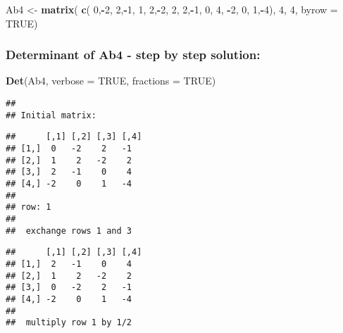 \documentclass[
  10pt,
  a4paper,
]{article}
\newenvironment{Shaded}{\begin{snugshade}}{\end{snugshade}}
\newcommand{\AttributeTok}[1]{\textcolor[rgb]{0.13,0.29,0.53}{#1}}
\newcommand{\ConstantTok}[1]{\textcolor[rgb]{0.56,0.35,0.01}{#1}}
\newcommand{\DecValTok}[1]{\textcolor[rgb]{0.00,0.00,0.81}{#1}}
\newcommand{\FunctionTok}[1]{\textcolor[rgb]{0.13,0.29,0.53}{\textbf{#1}}}
\newcommand{\NormalTok}[1]{#1}
\newcommand{\OtherTok}[1]{\textcolor[rgb]{0.56,0.35,0.01}{#1}}
\newcommand{\SpecialCharTok}[1]{\textcolor[rgb]{0.81,0.36,0.00}{\textbf{#1}}}
\begin{document}
\begin{Shaded}
\begin{Highlighting}[]
\NormalTok{Ab4 }\OtherTok{\textless{}{-}} \FunctionTok{matrix}\NormalTok{(}
        \FunctionTok{c}\NormalTok{( }\DecValTok{0}\NormalTok{,}\SpecialCharTok{{-}}\DecValTok{2}\NormalTok{, }\DecValTok{2}\NormalTok{,}\SpecialCharTok{{-}}\DecValTok{1}\NormalTok{,}
           \DecValTok{1}\NormalTok{, }\DecValTok{2}\NormalTok{,}\SpecialCharTok{{-}}\DecValTok{2}\NormalTok{, }\DecValTok{2}\NormalTok{,}
           \DecValTok{2}\NormalTok{,}\SpecialCharTok{{-}}\DecValTok{1}\NormalTok{, }\DecValTok{0}\NormalTok{, }\DecValTok{4}\NormalTok{,}
          \SpecialCharTok{{-}}\DecValTok{2}\NormalTok{, }\DecValTok{0}\NormalTok{, }\DecValTok{1}\NormalTok{,}\SpecialCharTok{{-}}\DecValTok{4}\NormalTok{), }\DecValTok{4}\NormalTok{, }\DecValTok{4}\NormalTok{, }\AttributeTok{byrow =} \ConstantTok{TRUE}\NormalTok{)}
\end{Highlighting}
\end{Shaded}

\hypertarget{determinant-of-ab4---step-by-step-solution}{%
\subsubsection{Determinant of Ab4 - step by step
solution:}\label{determinant-of-ab4---step-by-step-solution}}

\begin{Shaded}
\begin{Highlighting}[]
\FunctionTok{Det}\NormalTok{(Ab4, }\AttributeTok{verbose =} \ConstantTok{TRUE}\NormalTok{, }\AttributeTok{fractions =} \ConstantTok{TRUE}\NormalTok{)}
\end{Highlighting}
\end{Shaded}

\begin{verbatim}
## 
## Initial matrix:
\end{verbatim}

\begin{verbatim}
##      [,1] [,2] [,3] [,4]
## [1,]  0   -2    2   -1  
## [2,]  1    2   -2    2  
## [3,]  2   -1    0    4  
## [4,] -2    0    1   -4  
## 
## row: 1 
## 
##  exchange rows 1 and 3
\end{verbatim}

\begin{verbatim}
##      [,1] [,2] [,3] [,4]
## [1,]  2   -1    0    4  
## [2,]  1    2   -2    2  
## [3,]  0   -2    2   -1  
## [4,] -2    0    1   -4  
## 
##  multiply row 1 by 1/2
\end{verbatim}
\end{document}
